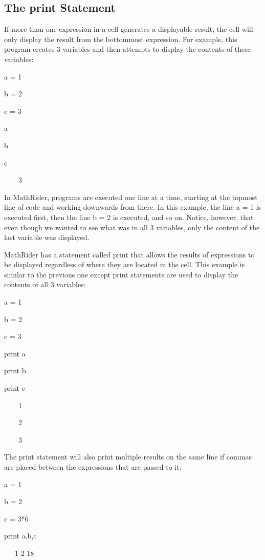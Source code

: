 \documentclass[12pt,oneside]{book}
\begin{document}
\subsection[The print Statement]{The print Statement}

If more than one expression in a cell generates a displayable result, the cell will only display the result from the bottommost expression. For example, this program creates 3 variables and then attempts to display the contents of these variables: 

a = 1

b = 2

c = 3

a

b

c

{\textbar}

\ \ \ \ 3


In MathRider, programs are executed one line at a time, starting at the topmost line of code and working downwards from there. In this example, the line a = 1 is executed first, then the line b = 2 is executed, and so on. Notice, however, that even though we wanted to see what was in all 3 variables, only the content of the last variable was displayed. 

MathRider has a statement called print that allows the results of expressions to be displayed regardless of where they are located in the cell. This example is similar to the previous one except print statements are used to display the contents of all 3 variables: 

a = 1

b = 2

c = 3

print a

print b

print c

{\textbar}

\ \ \ \ 1

\ \ \ \ 2

\ \ \ \ 3


The print statement will also print multiple results on the same line if commas are placed between the expressions that are passed to it:


a = 1

b = 2

c = 3*6

print a,b,c

{\textbar}

\ \ \ 1 2 18
\end{document}
